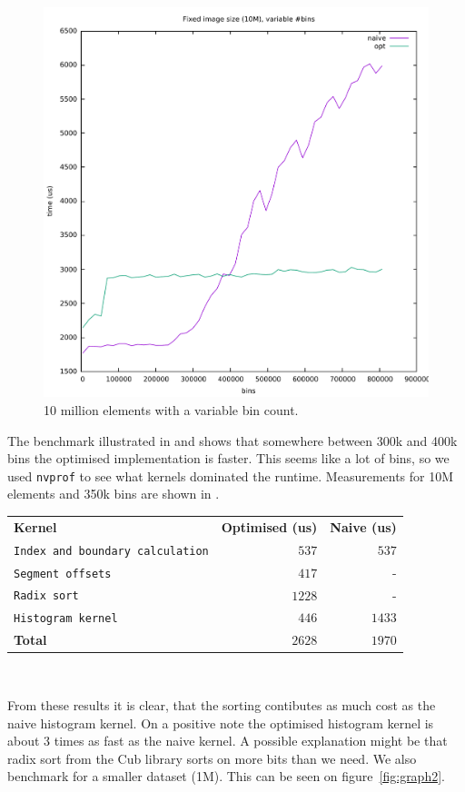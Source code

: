 \documentclass[12pt, a4paper, hidelinks]{article}
\def\fatline{\Xhline{2\arrayrulewidth}}
\renewcommand{\tt}[1]{\texttt{#1}}
\renewcommand{\bf}[1]{\textbf{#1}}
\begin{document}
\begin{figure}[htpb]
    \centering
    \includegraphics[width=0.6\linewidth]{img/graphs/10M-varbins.pdf}
    \caption{10 million elements with a variable bin count.}
    \label{fig:graph1}
\end{figure}

The benchmark illustrated in  and 
shows that somewhere between 300k and 400k bins
the optimised implementation is faster.
This seems like a lot of bins,
so we used \tt{nvprof} to see what kernels dominated the runtime.
Measurements for 10M elements and 350k bins are shown in .

\begin{center}
  \begin{tabular}{l|r|r}
    \bf{Kernel} & \bf{Optimised (us)} & \bf{Naive (us)}   \\ \fatline
    \tt{Index and boundary calculation} & $537$  & $537$  \\ \hline
    \tt{Segment offsets}                & $417$  & -      \\ \hline
    \tt{Radix sort}                     & $1228$ & -      \\ \hline
    \tt{Histogram kernel}               & $446$  & $1433$ \\ \fatline
    \bf{Total}                          & $2628$ & $1970$ \\
  \end{tabular}\\
  \label{table:nvprof0}
\end{center}

From these results it is clear, that the sorting contibutes as much cost
as the naive histogram kernel.
On a positive note the optimised histogram kernel is about 3 times as
fast as the naive kernel.
A possible explanation might be that radix sort from the Cub library
sorts on more bits than we need.
We also benchmark for a smaller dataset (1M).
This can be seen on figure~\ref{fig:graph2}.
\end{document}
